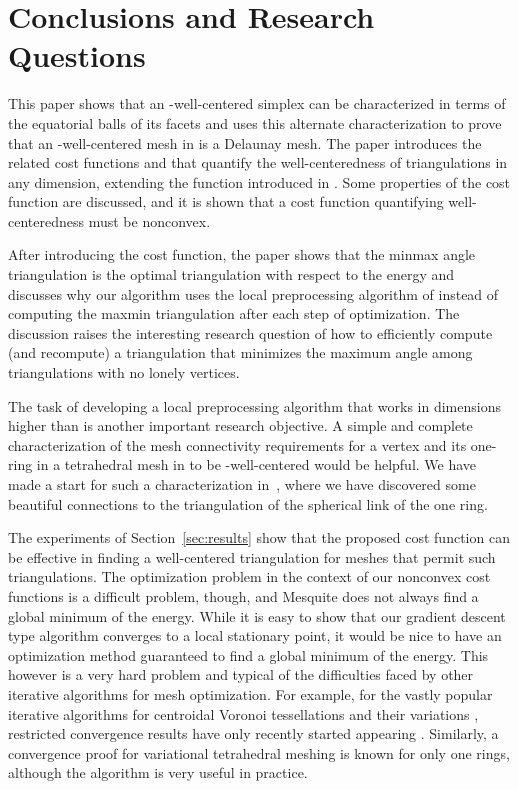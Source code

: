 \documentclass[final]{siamltex}
\begin{document}
\section{Conclusions and Research Questions}
\label{sec:conclusions}





This paper shows that an -well-centered simplex can be
characterized in terms of the equatorial balls of its facets and uses
this alternate characterization to prove that an -well-centered
mesh in  is a Delaunay mesh.  The paper introduces the
related cost functions  and  that quantify the
well-centeredness of triangulations in any dimension, extending the
function introduced in \cite{VaHiGuRa2007}.  Some properties of the
cost function are discussed, and it is shown that a cost function
quantifying well-centeredness must be nonconvex.


After introducing the cost function, the paper shows that the minmax
angle triangulation is the optimal triangulation with respect to the
 energy and discusses why our algorithm uses the local
preprocessing algorithm of \cite{VaHiGuRa2007} instead of computing
the maxmin triangulation after each step of optimization.  The
discussion raises the interesting research question of how to
efficiently compute (and recompute)
a triangulation that minimizes the
maximum angle among triangulations with no lonely vertices.

The task
of developing a local preprocessing algorithm that works in
dimensions higher than  is another important research objective.
A simple and complete characterization of the mesh connectivity
requirements for a vertex and its one-ring in a tetrahedral mesh in
 to be -well-centered would be helpful. We have made a
start for such a characterization in~\cite{VaHiGuRaZh2008}, where we
have discovered some beautiful connections to the triangulation of the
spherical link of the one ring.


The experiments of Section~\ref{sec:results} show that the proposed cost
function can be effective in finding a well-centered triangulation for
meshes that permit such triangulations.  The optimization problem in
the context of our nonconvex cost functions  is a difficult
problem, though, and Mesquite does not always find a global minimum of
the energy. While it is easy to show that our gradient descent type
algorithm converges to a local stationary point, it would be nice to
have an optimization method guaranteed to find a global minimum of the
energy. This however is a very hard problem and typical of the
difficulties faced by other iterative algorithms for mesh
optimization. For example, for the vastly popular iterative algorithms
for centroidal Voronoi tessellations \cite{DuFaGu1999} and their
variations \cite{DuGuJu2003, DuWa2005}, restricted convergence results
have only recently started appearing
\cite{DuEmJu2006,EmJuRa2008}. Similarly, a convergence proof for
variational tetrahedral meshing \cite{AlCoYvDe2005} is known for only
one rings, although the algorithm is very useful in practice.
\end{document}
